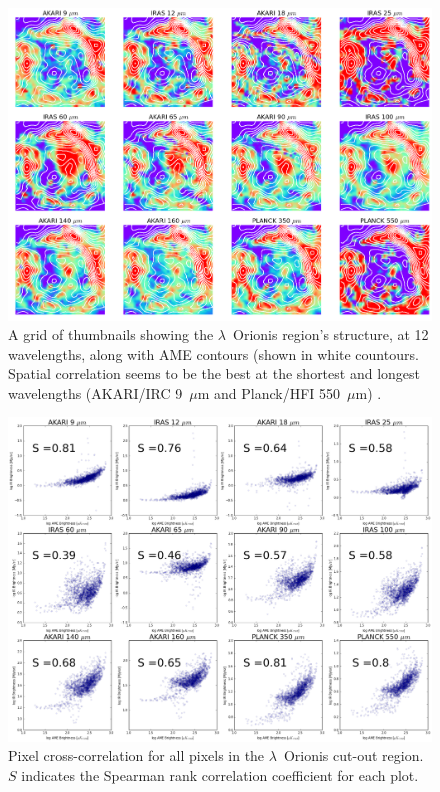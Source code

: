 \documentclass[preprint2,longabstract]{aastex}
\begin{document}
\begin{figure}
  \label{fig:orionis-img}
  \includegraphics[width=170mm]{../Plots/lOrionis_grid_img.png}
  \centering
  \caption{A grid of thumbnails showing the $\lambda$~Orionis region's structure, at 12 wavelengths, along with AME contours (shown in white countours. Spatial correlation seems to be the best at the shortest and longest wavelengths (AKARI/IRC 9~$\mu$m and Planck/HFI 550~$\mu$m) .}
\end{figure}

\begin{figure}
  \label{fig:orionis-corr}
  \includegraphics[width=170mm]{../Plots/orionis_correlations_AME.png}
  \centering
  \caption{Pixel cross-correlation for all pixels in the $\lambda$~Orionis cut-out region.  $S$ indicates the Spearman rank correlation coefficient for each plot.}
\end{figure}
\end{document}
